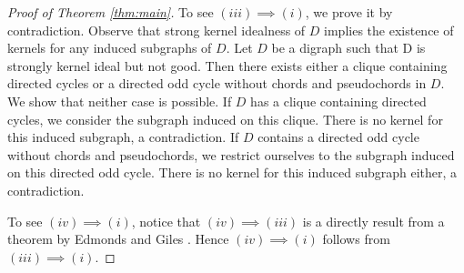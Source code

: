 \documentclass[11pt]{article}
\numberwithin{theorem}{section}
\begin{document}
\begin{proof}[Proof of Theorem \ref{thm:main}]
To see $(iii)\implies (i)$, we prove it by contradiction. Observe that strong kernel idealness of  $D$ implies the existence of kernels for any induced subgraphs of $D$. Let $D$ be a digraph such that D is strongly kernel ideal but not good. Then there exists either a clique containing directed cycles or a directed odd cycle without chords and pseudochords in $D$. We show that neither case is possible. If $D$ has a clique containing directed cycles, we consider the subgraph induced on this clique. There is no kernel for this induced subgraph, a contradiction. If $D$ contains a directed odd cycle without chords and pseudochords, we restrict ourselves to the subgraph induced on this directed odd cycle. There is no kernel for this induced subgraph either, a contradiction.

To see $(iv)\implies (i)$, notice that $(iv)\implies (iii)$ is a directly result from a theorem by Edmonds and Giles \cite{EdmoGile77}.  Hence $(iv)\implies (i)$ follows from $(iii)\implies (i)$.

\end{proof}




\nocite{Schr86}
\end{document}
